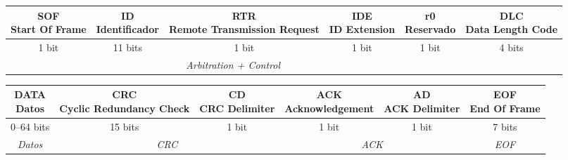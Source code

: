 \centering
\renewcommand{\arraystretch}{1.4}

\begin{tabular}{|c|c|c|c|c|c|}
\hline
\makecell{\textbf{SOF} \\ \scriptsize{Start Of Frame}} &
\makecell{\textbf{ID} \\ \scriptsize{Identificador}} &
\makecell{\textbf{RTR} \\ \scriptsize{Remote Transmission Request}} &
\makecell{\textbf{IDE} \\ \scriptsize{ID Extension}} &
\makecell{\textbf{r0} \\ \scriptsize{Reservado}} &
\makecell{\textbf{DLC} \\ \scriptsize{Data Length Code}} \\
\hline
1 bit & 11 bits & 1 bit & 1 bit & 1 bit & 4 bits \\
\hline
\multicolumn{5}{|c|}{\textit{Arbitration + Control}} & \\
\hline
\end{tabular}

\vspace{0.5cm}

\begin{tabular}{|c|c|c|c|c|c|}
\hline
\makecell{\textbf{DATA} \\ \scriptsize{Datos}} &
\makecell{\textbf{CRC} \\ \scriptsize{Cyclic Redundancy Check}} &
\makecell{\textbf{CD} \\ \scriptsize{CRC Delimiter}} &
\makecell{\textbf{ACK} \\ \scriptsize{Acknowledgement}} &
\makecell{\textbf{AD} \\ \scriptsize{ACK Delimiter}} &
\makecell{\textbf{EOF} \\ \scriptsize{End Of Frame}} \\
\hline
0--64 bits & 15 bits & 1 bit & 1 bit & 1 bit & 7 bits \\
\hline
\textit{Datos} & \multicolumn{2}{c|}{\textit{CRC}} & \multicolumn{2}{c|}{\textit{ACK}} & \textit{EOF} \\
\hline
\end{tabular}